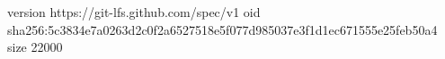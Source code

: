 version https://git-lfs.github.com/spec/v1
oid sha256:5c3834e7a0263d2c0f2a6527518e5f077d985037e3f1d1ec671555e25feb50a4
size 22000
